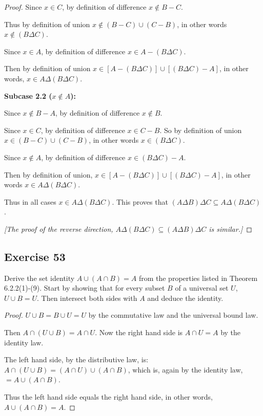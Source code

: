 \documentclass[14pt]{extarticle}
\begin{document}
\begin{proof}
  Since \(x \in C\), by definition of difference \(x \notin B - C\).

  Thus by definition of union \(x \notin (B-C) \cup (C-B)\), in other words \(x \notin (B \Delta C)\).

  Since \(x \in A\), by definition of difference \(x \in A - (B \Delta C)\).

  Then by definition of union \(x \in [A - (B \Delta C)] \cup [(B \Delta C) - A]\), in other words,
  \(x \in A \Delta(B \Delta C)\).

    {\bf Subcase 2.2 (\(x \notin A\)):}

  Since \(x \notin B-A\), by definition of difference \(x \notin B\).

  Since \(x \in C\), by definition of difference \(x \in C - B\). So by definition of union \(x \in (B-C) \cup (C-B)\),
  in other words \(x \in (B \Delta C)\).

  Since \(x \notin A\), by definition of difference \(x \in (B \Delta C) - A\).

  Then by definition of union, \(x \in [A - (B \Delta C)] \cup [(B \Delta C) - A]\), in other words
  \(x \in A \Delta (B \Delta C)\).

  Thus in all cases \(x \in A \Delta (B \Delta C)\). This proves that
  \((A \Delta B) \Delta C \subseteq A \Delta (B \Delta C)\).

    {\it [The proof of the reverse direction, \(A \Delta (B \Delta C) \subseteq (A \Delta B) \Delta C\) is similar.]}
\end{proof}

\subsection{Exercise 53}
Derive the set identity \(A \cup (A \cap B) = A\) from the properties listed in Theorem 6.2.2(1)-(9). Start by showing
that for every subset $B$ of a universal set $U$, \(U \cup B = U\). Then intersect both sides with $A$ and deduce the identity.

\begin{proof}
  \(U \cup B = B \cup U = U\) by the commutative law and the universal bound law.

  Then \(A \cap (U \cup B) = A \cap U\). Now the right hand side is \(A \cap U = A\) by the identity law.

  The left hand side, by the distributive law, is: \(A \cap (U \cup B) = (A \cap U) \cup (A \cap B)\), which is, again
  by the identity law, \(= A \cup (A \cap B)\).

  Thus the left hand side equals the right hand side, in other words, \(A \cup (A \cap B) = A\).
\end{proof}
\end{document}
